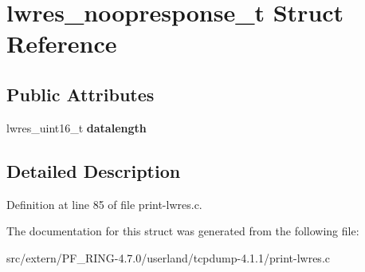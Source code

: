 \hypertarget{structlwres__noopresponse__t}{
\section{lwres\_\-noopresponse\_\-t Struct Reference}
\label{structlwres__noopresponse__t}
}
\subsection*{Public Attributes}
\begin{DoxyCompactItemize}
\item 
\hypertarget{structlwres__noopresponse__t_ac9f481acbb958d8ed85f8a6a371aca76}{
lwres\_\-uint16\_\-t {\bfseries datalength}}
\label{structlwres__noopresponse__t_ac9f481acbb958d8ed85f8a6a371aca76}

\end{DoxyCompactItemize}


\subsection{Detailed Description}


Definition at line 85 of file print-\/lwres.c.



The documentation for this struct was generated from the following file:\begin{DoxyCompactItemize}
\item 
src/extern/PF\_\-RING-\/4.7.0/userland/tcpdump-\/4.1.1/print-\/lwres.c\end{DoxyCompactItemize}
